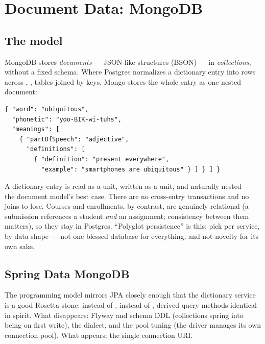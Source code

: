 \chapter{Document Data: MongoDB}
\label{ch:mongodb}

\section{The model}

MongoDB stores \emph{documents} --- JSON-like structures (BSON) --- in
\emph{collections}, without a fixed schema. Where Postgres normalizes a
dictionary entry into rows across , ,
 tables joined by keys, Mongo stores the whole entry as
one nested document:

\begin{lstlisting}
{ "word": "ubiquitous",
  "phonetic": "yoo-BIK-wi-tuhs",
  "meanings": [
    { "partOfSpeech": "adjective",
      "definitions": [
        { "definition": "present everywhere",
          "example": "smartphones are ubiquitous" } ] } ] }
\end{lstlisting}

\begin{decision}
A dictionary entry is read as a unit, written as a unit, and naturally
nested --- the document model's best case. There are no cross-entry
transactions and no joins to lose. Courses and enrollments, by contrast,
are genuinely relational (a submission references a student \emph{and}
an assignment; consistency between them matters), so they stay in
Postgres. ``Polyglot persistence'' is this: pick per service, by data
shape --- not one blessed database for everything, and not novelty for
its own sake.
\end{decision}

\section{Spring Data MongoDB}

The programming model mirrors JPA closely enough that the dictionary
service is a good Rosetta stone:  instead of
,  instead of ,
derived query methods identical in spirit. What disappears: Flyway and
schema DDL (collections spring into being on first write), the dialect,
and the pool tuning (the driver manages its own connection pool).
What appears: the single connection URI.

